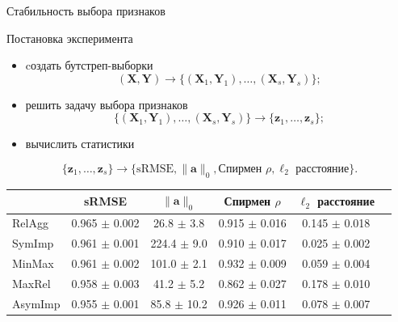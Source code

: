 \documentclass[9pt]{beamer}
\newcommand{\bz}{\mathbf{z}}
\newcommand{\ba}{\mathbf{a}}
\newcommand{\bY}{\mathbf{Y}}
\newcommand{\bX}{\mathbf{X}}
\begin{document}
\begin{frame}{Стабильность выбора признаков}
\begin{block}{Постановка эксперимента}
	\begin{itemize}
	\item cоздать бутстреп-выборки
	\vspace{-0.1cm}
	\[
		(\bX, \bY) \rightarrow \bigl\{(\bX_1, \bY_1), \dots, (\bX_s, \bY_s)\bigr\};
	\]
	\item решить задачу выбора признаков
	\vspace{-0.1cm}
	\[
		 \bigl\{(\bX_1, \bY_1), \dots, (\bX_s, \bY_s)\bigr\}  \rightarrow \{\bz_1, \dots, \bz_s\};
	\]
	\item вычислить статистики
	\vspace{-0.1cm}
	\end{itemize}
	\[
		\{\bz_1, \dots, \bz_s\} \rightarrow \{ \text{sRMSE}, \|\ba\|_0, \text{Спирмен }\rho, \ell_2 \text{ расстояние}\}.
	\]
\end{block}
\renewcommand{\arraystretch}{1.2}
\begin{table}[]
	\centering
	\begin{tabular}{l|ccccc}
		\hline
		& sRMSE  & $\|\ba\|_0$ & Спирмен $\rho$ & $\ell_2$ расстояние \\ \hline
		RelAgg & 0.965 $\pm$ 0.002 & 26.8 $\pm$ 3.8 & 0.915 $\pm$ 0.016 & 0.145 $\pm$ 0.018   \\
		SymImp & 0.961 $\pm$ 0.001 & 224.4 $\pm$ 9.0 & 0.910 $\pm$ 0.017 & 0.025 $\pm$ 0.002   \\
		MinMax & 0.961 $\pm$ 0.002 & 101.0 $\pm$ 2.1& 0.932 $\pm$ 0.009 & 0.059 $\pm$ 0.004   \\
		MaxRel & 0.958 $\pm$ 0.003 & 41.2 $\pm$ 5.2 & 0.862 $\pm$ 0.027 & 0.178 $\pm$ 0.010   \\
		AsymImp & 0.955 $\pm$ 0.001 & 85.8 $\pm$ 10.2& 0.926 $\pm$ 0.011 & 0.078 $\pm$ 0.007  \\ \hline
	\end{tabular}
\end{table}
\end{frame}
\end{document}
